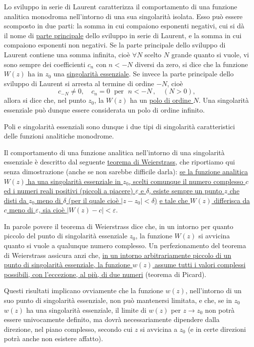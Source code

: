 \documentclass[11pt, a4paper]{book}
\numberwithin{equation}{section}
\begin{document}
Lo sviluppo in serie di Laurent caratterizza il comportamento di una funzione analitica monodroma nell'intorno di una sua singolarità isolata. Esso può essere scomposto in due parti: la somma in cui compaiono esponenti negativi, cui si dà il nome di \underline{parte principale} dello sviluppo in serie di Laurent, e la somma in cui compaiono esponenti non negativi. Se la parte principale dello sviluppo di Laurent contiene una somma infinita, cioè $\forall N$ scelto $N$ grande quanto si vuole, vi sono sempre dei coefficienti $c_n$ con $n < -N$ diversi da zero, si dice che la funzione $W(z)$ ha in $z_0$ una \uline{singolarità essenziale}. Se invece la parte principale dello sviluppo di Laurent si arresta al termine di ordine $-N$, cioè
\begin{equation}
c_{-N} \neq 0, \quad c_n = 0 \;\text{ per }\; n < -N\,, \quad (N>0), \tag{5}
\end{equation}
allora si dice che, nel punto $z_0$, la $W(z)$ ha un \uline{polo di ordine $N$}. Una singolarità essenziale può dunque essere considerata un polo di ordine infinito.

Poli e singolarità essenziali sono dunque i due tipi di singolarità caratteristici delle funzioni analitiche monodrome.

Il comportamento di una funzione analitica nell'intorno di una singolarità essenziale è descritto dal seguente \underline{teorema di Weierstrass}, che riportiamo qui senza dimostrazione (anche se non sarebbe difficile darla): \uline{se la funzione analitica $W(z)$ ha una singolarità essenziale in $z_0$, scelti comunque il numero complesso $c$ ed i numeri reali positivi (piccoli a piacere) $\varepsilon$ e $\delta$, esiste sempre un punto $z$ che disti da $z_0$ meno di $\delta$ (per il quale cioè $|z - z_0| < \delta$)}%
\uline{e tale che $W(z)$ differisca da $c$ meno di $\varepsilon$, sia cioè $|W(z) - c| < \varepsilon$}.

In parole povere il teorema di Weierstrass dice che, in un intorno per quanto piccolo del punto di singolarità essenziale $z_0$, la funzione $W(z)$ si avvicina quanto si vuole a qualunque numero complesso. Un perfezionamento del teorema di Weierstrass assicura anzi che, \uline{in un intorno arbitrariamente piccolo di un punto di singolarità essenziale, la funzione $w(z)$ assume tutti i valori complessi possibili, con l'eccezione, al più, di due numeri} (teorema di Picard).

Questi risultati implicano ovviamente che la funzione $w(z)$, nell'intorno di un suo punto di singolarità essenziale, non può mantenersi limitata, e che, se in $z_0$ $w(z)$ ha una singolarità essenziale, il limite di $w(z)$ per $z \to z_0$ non potrà essere univocamente definito, ma dovrà necessariamente dipendere dalla direzione, nel piano complesso, secondo cui $z$ si avvicina a $z_0$ (e in certe direzioni potrà anche non esistere affatto).
\end{document}
